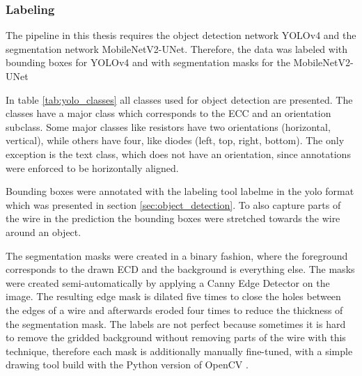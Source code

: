 \subsubsection{Labeling}

The pipeline in this thesis requires the object detection network \ac{YOLOv4} and the segmentation network MobileNetV2-UNet.
Therefore, the data was labeled with bounding boxes for \ac{YOLOv4} and with segmentation masks for the MobileNetV2-UNet

In table \ref{tab:yolo_classes} all classes used for object detection are presented.
The classes have a major class which corresponds to the \ac{ECC} and an orientation subclass.
Some major classes like resistors have two orientations (horizontal, vertical), while others have four, like diodes (left, top, right, bottom).
The only exception is the text class, which does not have an orientation, since annotations were enforced to be horizontally aligned.

Bounding boxes were annotated with the labeling tool labelme \cite{labelme} in the yolo format which was presented in section \ref{sec:object_detection}.
To also capture parts of the wire in the prediction the bounding boxes were stretched towards the wire around an object.

The segmentation masks were created in a binary fashion, where the foreground corresponds to the drawn \ac{ECD} and the background is everything else.
The masks were created semi-automatically by applying a Canny Edge Detector \cite{canny_edge} on the image.
The resulting edge mask is dilated five times to close the holes between the edges of a wire and afterwards eroded four times to reduce the thickness of the segmentation mask.
The labels are not perfect because sometimes it is hard to remove the gridded background without removing parts of the wire with this technique, therefore each mask is additionally manually fine-tuned, with a simple drawing tool build with the Python version of OpenCV \cite{opencv}.

